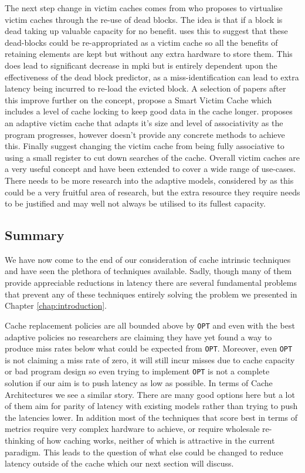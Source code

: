 The next step change in victim caches comes from \citet{khanUsingDeadBlocks2010} who proposes to virtualise victim caches through the re-use of dead blocks. The idea is that if a block is dead taking up valuable capacity for no benefit. \citeauthor{khanUsingDeadBlocks2010} uses this to suggest that these dead-blocks could be re-appropriated as a victim cache so all the benefits of retaining elements are kept but without any extra hardware to store them. This does lead to significant decrease in \gls{mpki} but is entirely dependent upon the effectiveness of the dead block predictor, as a miss-identification can lead to extra latency being incurred to re-load the evicted block. A selection of papers after this improve further on the concept, \citet{asaduzzamanEffectiveLockingfreeCaching2014} propose a Smart Victim Cache which includes a level of cache locking to keep good data in the cache longer. \citet{navarroAdaptiveVictimCache2014} proposes an adaptive victim cache that adapts it's size and level of associativity as the program progresses, however doesn't provide any concrete methods to achieve this. Finally \citet{subhaArchitectureVictimCache2016} suggest changing the victim cache from being fully associative to using a small register to cut down searches of the cache. Overall victim caches are a very useful concept and have been extended to cover a wide range of use-cases. There needs to be more research into the adaptive models, considered by \citet{navarroAdaptiveVictimCache2014} as this could be a very fruitful area of research, but the extra resource they require needs to be justified and may well not always be utilised to its fullest capacity.

\subsection{Summary}
We have now come to the end of our consideration of cache intrinsic techniques and have seen the plethora of techniques available. Sadly, though many of them provide appreciable reductions in latency there are several fundamental problems that prevent any of these techniques entirely solving the problem we presented in Chapter \ref{chap:introduction}. 

Cache replacement policies are all bounded above by \texttt{OPT} and even with the best adaptive policies no researchers are claiming they have yet found a way to produce miss rates below what could be expected from \texttt{OPT}. Moreover, even \texttt{OPT} is not claiming a miss rate of zero, it will still incur misses due to cache capacity or bad program design so even trying to implement \texttt{OPT} is not a complete solution if our aim is to push latency as low as possible. In terms of Cache Architectures we see a similar story. There are many good options here but a lot of them aim for parity of latency with existing models rather than trying to push the latencies lower. In addition most of the techniques that score best in terms of metrics require very complex hardware to achieve, or require wholesale re-thinking of how caching works, neither of which is attractive in the current paradigm. This leads to the question of what else could be changed to reduce latency outside of the cache which our next section will discuss.


